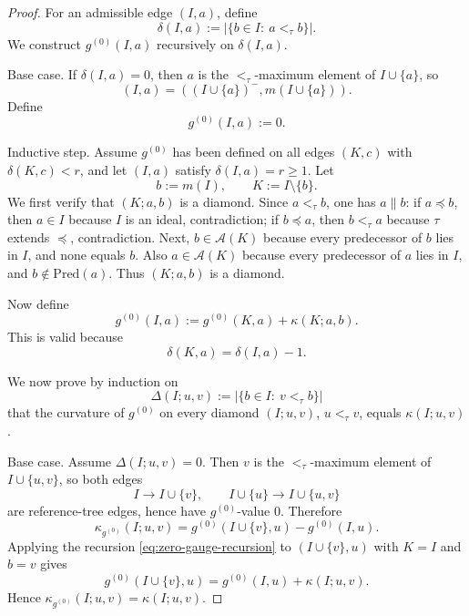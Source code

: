 \documentclass[10pt,a4paper]{amsart}
\providecommand{\paragraph}{}
\begin{document}
\begin{proof}
For an admissible edge \((I,a)\), define
\begin{equation}
\delta(I,a):=\bigl|\{b\in I:\ a<_{\tau} b\}\bigr|.
\label{eq:delta-recursion}
\end{equation}
We construct \(g^{(0)}(I,a)\) recursively on \(\delta(I,a)\).

\paragraph{Base case.}
If \(\delta(I,a)=0\), then \(a\) is the \(<_{\tau}\)-maximum element of \(I\cup\{a\}\), so
\[
(I,a)=((I\cup\{a\})^-,m(I\cup\{a\})).
\]
Define
\begin{equation}
g^{(0)}(I,a):=0.
\label{eq:zero-gauge-base}
\end{equation}

\paragraph{Inductive step.}
Assume \(g^{(0)}\) has been defined on all edges \((K,c)\) with \(\delta(K,c)<r\), and let \((I,a)\) satisfy \(\delta(I,a)=r\ge 1\). Let
\[
b:=m(I),\qquad K:=I\setminus\{b\}.
\]
We first verify that \((K;a,b)\) is a diamond. Since \(a<_{\tau}b\), one has \(a\parallel b\): if \(a\preceq b\), then \(a\in I\) because \(I\) is an ideal, contradiction; if \(b\preceq a\), then \(b<_{\tau}a\) because \(\tau\) extends \(\preceq\), contradiction. Next, \(b\in \mathcal A(K)\) because every predecessor of \(b\) lies in \(I\), and none equals \(b\). Also \(a\in \mathcal A(K)\) because every predecessor of \(a\) lies in \(I\), and \(b\notin \mathrm{Pred}(a)\). Thus \((K;a,b)\) is a diamond.

Now define
\begin{equation}
g^{(0)}(I,a):=g^{(0)}(K,a)+\kappa(K;a,b).
\label{eq:zero-gauge-recursion}
\end{equation}
This is valid because
\[
\delta(K,a)=\delta(I,a)-1.
\]

We now prove by induction on
\[
\Delta(I;u,v):=\bigl|\{b\in I:\ v<_{\tau} b\}\bigr|
\]
that the curvature of \(g^{(0)}\) on every diamond \((I;u,v)\), \(u<_{\tau}v\), equals \(\kappa(I;u,v)\).

\paragraph{Base case.}
Assume \(\Delta(I;u,v)=0\). Then \(v\) is the \(<_{\tau}\)-maximum element of \(I\cup\{u,v\}\), so both edges
\[
I\to I\cup\{v\},
\qquad
I\cup\{u\}\to I\cup\{u,v\}
\]
are reference-tree edges, hence have \(g^{(0)}\)-value \(0\). Therefore
\[
\kappa_{g^{(0)}}(I;u,v)=g^{(0)}(I\cup\{v\},u)-g^{(0)}(I,u).
\]
Applying the recursion \eqref{eq:zero-gauge-recursion} to \((I\cup\{v\},u)\) with \(K=I\) and \(b=v\) gives
\[
g^{(0)}(I\cup\{v\},u)=g^{(0)}(I,u)+\kappa(I;u,v).
\]
Hence \(\kappa_{g^{(0)}}(I;u,v)=\kappa(I;u,v)\).


\end{proof}
\end{document}
